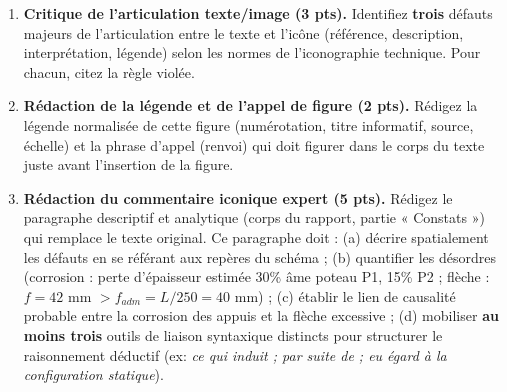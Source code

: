 \documentclass[11pt]{article}
\begin{document}
\begin{exercice}
\begin{enumerate}
    \item \textbf{Critique de l'articulation texte/image (3 pts).} Identifiez \textbf{trois} défauts majeurs de l'articulation entre le texte et l'icône (référence, description, interprétation, légende) selon les normes de l'iconographie technique. Pour chacun, citez la règle violée.
    \item \textbf{Rédaction de la légende et de l'appel de figure (2 pts).} Rédigez la légende normalisée de cette figure (numérotation, titre informatif, source, échelle) et la phrase d'appel (renvoi) qui doit figurer dans le corps du texte juste avant l'insertion de la figure.
    \item \textbf{Rédaction du commentaire iconique expert (5 pts).} Rédigez le paragraphe descriptif et analytique (corps du rapport, partie « Constats ») qui remplace le texte original. Ce paragraphe doit : (a) décrire spatialement les défauts en se référant aux repères du schéma ; (b) quantifier les désordres (corrosion : perte d'épaisseur estimée 30\% âme poteau P1, 15\% P2 ; flèche : $f = 42$ mm $> f_{adm} = L/250 = 40$ mm) ; (c) établir le lien de causalité probable entre la corrosion des appuis et la flèche excessive ; (d) mobiliser \textbf{au moins trois} outils de liaison syntaxique distincts pour structurer le raisonnement déductif (ex: \textit{ce qui induit ; par suite de ; eu égard à la configuration statique}).
\end{enumerate}
\end{exercice}
\end{document}
